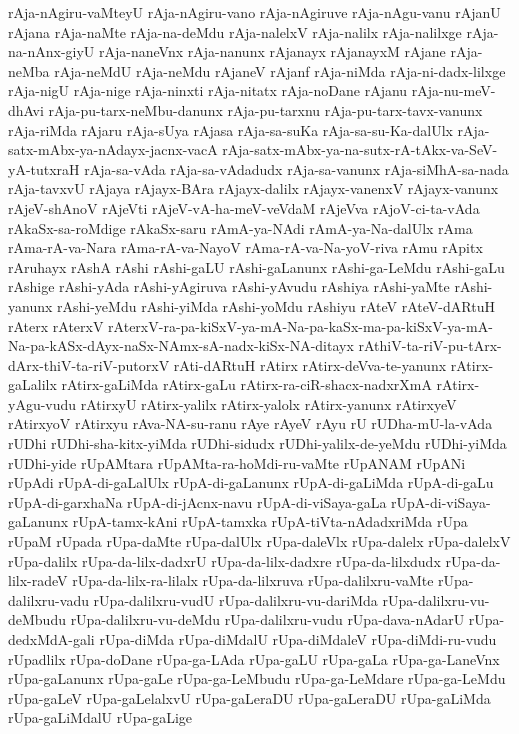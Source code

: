 {rAja-nAgiru-vaMteyU
rAja-nAgiru-vano
rAja-nAgiruve
rAja-nAgu-vanu
rAjanU
rAjana
rAja-naMte
rAja-na-deMdu
rAja-nalelxV
rAja-nalilx
rAja-nalilxge
rAja-na-nAnx-giyU
rAja-naneVnx
rAja-nanunx
rAjanayx
rAjanayxM
rAjane
rAja-neMba
rAja-neMdU
rAja-neMdu
rAjaneV
rAjanf
rAja-niMda
rAja-ni-dadx-lilxge
rAja-nigU
rAja-nige
rAja-ninxti
rAja-nitatx
rAja-noDane
rAjanu
rAja-nu-meV-dhAvi
rAja-pu-tarx-neMbu-danunx
rAja-pu-tarxnu
rAja-pu-tarx-tavx-vanunx
rAja-riMda
rAjaru
rAja-sUya
rAjasa
rAja-sa-suKa
rAja-sa-su-Ka-dalUlx
rAja-satx-mAbx-ya-nAdayx-jacnx-vacA
rAja-satx-mAbx-ya-na-sutx-rA-tAkx-va-SeV-yA-tutxraH
rAja-sa-vAda
rAja-sa-vAdadudx
rAja-sa-vanunx
rAja-siMhA-sa-nada
rAja-tavxvU
rAjaya
rAjayx-BAra
rAjayx-dalilx
rAjayx-vanenxV
rAjayx-vanunx
rAjeV-shAnoV
rAjeVti
rAjeV-vA-ha-meV-veVdaM
rAjeVva
rAjoV-ci-ta-vAda
rAkaSx-sa-roMdige
rAkaSx-saru
rAmA-ya-NAdi
rAmA-ya-Na-dalUlx
rAma
rAma-rA-va-Nara
rAma-rA-va-NayoV
rAma-rA-va-Na-yoV-riva
rAmu
rApitx
rAruhayx
rAshA
rAshi
rAshi-gaLU
rAshi-gaLanunx
rAshi-ga-LeMdu
rAshi-gaLu
rAshige
rAshi-yAda
rAshi-yAgiruva
rAshi-yAvudu
rAshiya
rAshi-yaMte
rAshi-yanunx
rAshi-yeMdu
rAshi-yiMda
rAshi-yoMdu
rAshiyu
rAteV
rAteV-dARtuH
rAterx
rAterxV
rAterxV-ra-pa-kiSxV-ya-mA-Na-pa-kaSx-ma-pa-kiSxV-ya-mA-Na-pa-kASx-dAyx-naSx-NAmx-sA-nadx-kiSx-NA-ditayx
rAthiV-ta-riV-pu-tArx-dArx-thiV-ta-riV-putorxV
rAti-dARtuH
rAtirx
rAtirx-deVva-te-yanunx
rAtirx-gaLalilx
rAtirx-gaLiMda
rAtirx-gaLu
rAtirx-ra-ciR-shacx-nadxrXmA
rAtirx-yAgu-vudu
rAtirxyU
rAtirx-yalilx
rAtirx-yalolx
rAtirx-yanunx
rAtirxyeV
rAtirxyoV
rAtirxyu
rAva-NA-su-ranu
rAye
rAyeV
rAyu
rU
rUDha-mU-la-vAda
rUDhi
rUDhi-sha-kitx-yiMda
rUDhi-sidudx
rUDhi-yalilx-de-yeMdu
rUDhi-yiMda
rUDhi-yide
rUpAMtara
rUpAMta-ra-hoMdi-ru-vaMte
rUpANAM
rUpANi
rUpAdi
rUpA-di-gaLalUlx
rUpA-di-gaLanunx
rUpA-di-gaLiMda
rUpA-di-gaLu
rUpA-di-garxhaNa
rUpA-di-jAcnx-navu
rUpA-di-viSaya-gaLa
rUpA-di-viSaya-gaLanunx
rUpA-tamx-kAni
rUpA-tamxka
rUpA-tiVta-nAdadxriMda
rUpa
rUpaM
rUpada
rUpa-daMte
rUpa-dalUlx
rUpa-daleVlx
rUpa-dalelx
rUpa-dalelxV
rUpa-dalilx
rUpa-da-lilx-dadxrU
rUpa-da-lilx-dadxre
rUpa-da-lilxdudx
rUpa-da-lilx-radeV
rUpa-da-lilx-ra-lilalx
rUpa-da-lilxruva
rUpa-dalilxru-vaMte
rUpa-dalilxru-vadu
rUpa-dalilxru-vudU
rUpa-dalilxru-vu-dariMda
rUpa-dalilxru-vu-deMbudu
rUpa-dalilxru-vu-deMdu
rUpa-dalilxru-vudu
rUpa-dava-nAdarU
rUpa-dedxMdA-gali
rUpa-diMda
rUpa-diMdalU
rUpa-diMdaleV
rUpa-diMdi-ru-vudu
rUpadlilx
rUpa-doDane
rUpa-ga-LAda
rUpa-gaLU
rUpa-gaLa
rUpa-ga-LaneVnx
rUpa-gaLanunx
rUpa-gaLe
rUpa-ga-LeMbudu
rUpa-ga-LeMdare
rUpa-ga-LeMdu
rUpa-gaLeV
rUpa-gaLelalxvU
rUpa-gaLeraDU
rUpa-gaLeraDU
rUpa-gaLiMda
rUpa-gaLiMdalU
rUpa-gaLige
}
